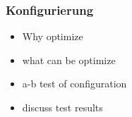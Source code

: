 \subsubsection{Konfigurierung}
\label{ssub:konfigurierung}
  \begin{itemize}
    \item Why optimize
    \item what can be optimize
    \item a-b test of configuration
    \item discuss test results
  \end{itemize}
